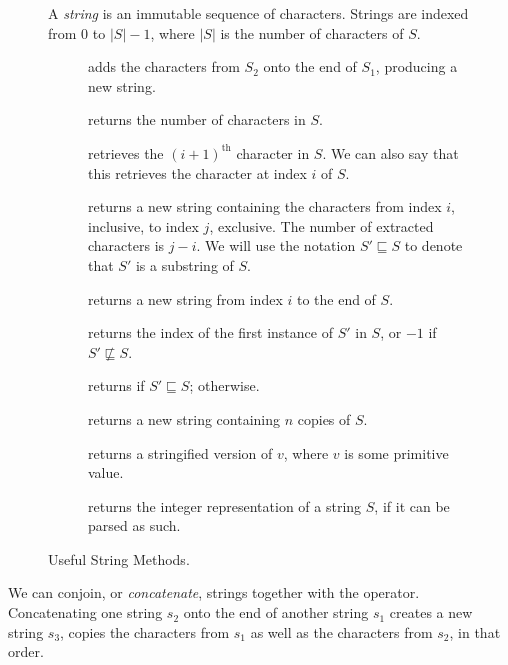 \begin{figure}[tp]
    \small
    \begin{tcolorbox}[title=String Class]
      A \emph{string} is an immutable sequence of characters. Strings are indexed from $0$ to $|S|-1$, where $|S|$ is the number of characters of $S$.
      \vspace{2ex}
    \begin{description}
      \item[] adds the characters from $S_2$ onto the end of $S_1$, producing a new string.
      \item[] returns the number of characters in $S$.
      \item[] retrieves the $(i + 1)^\text{th}$ character in $S$. We can also say that this retrieves the character at index $i$ of $S$.
      \item[] returns a new string containing the characters from index $i$, inclusive, to index $j$, exclusive. The number of extracted characters is $j - i$. We will use the notation $S' \sqsubseteq S$ to denote that $S'$ is a substring of $S$.
      \item[] returns a new string from index $i$ to the end of $S$.
      \item[] returns the index of the first instance of $S'$ in $S$, or $-1$ if $S' \not\sqsubseteq S$.
      \item[] returns  if $S' \sqsubseteq S$;  otherwise.
      \item[] returns a new string containing $n$ copies of $S$.
      \item[] returns a stringified version of $v$, where $v$ is some primitive value.
      \item[] returns the integer representation of a string $S$, if it can be parsed as such.
    \end{description}
  \end{tcolorbox}
    \caption{Useful String Methods.}
    \label{fig:strings}
  \end{figure}

We can conjoin, or \emph{concatenate}, strings together with the \ttt{+} operator. Concatenating one string $s_2$ onto the end of another string $s_1$ creates a new string $s_3$, copies the characters from $s_1$ as well as the characters from $s_2$, in that order. 

